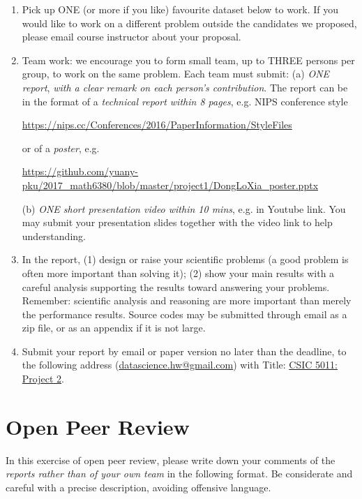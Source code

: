 \documentclass[11pt]{article}
\begin{document}
\begin{enumerate}
\item Pick up ONE (or more if you like) favourite dataset below to work. If you would like to work on a different problem outside the candidates we proposed, please email course instructor about your proposal.  
\item Team work: we encourage you to form small team, up to THREE persons per group, to work on the same problem. Each team must submit:
\subitem(a) \emph{ONE report}, \emph{with a clear remark on each person's contribution}. The report can be in the format of a \emph{technical report within 8 pages}, e.g. NIPS conference style 
\begin{center}
\url{https://nips.cc/Conferences/2016/PaperInformation/StyleFiles} 
\end{center}
or of a \emph{poster}, e.g. 
\begin{center}%
\url{https://github.com/yuany-pku/2017_math6380/blob/master/project1/DongLoXia_poster.pptx}
\end{center}
\subitem(b) \emph{ONE short presentation video within 10 mins}, e.g. in Youtube link. You may submit your presentation slides together with the video link to help understanding. 
\item In the report, (1) design or raise your scientific problems (a good problem is often more important than solving it); (2) show your main results with a careful analysis supporting the results toward answering your problems. Remember: scientific analysis and reasoning are more important than merely the performance results. Source codes may be submitted through email as a zip file, or as an appendix if it is not large.    
\item Submit your report by email or paper version no later than the deadline, to the following address (\href{mailto:datascience.hw@gmail.com}{datascience.hw@gmail.com}) with Title: \underline{CSIC 5011: Project 2}. %
\end{enumerate}

\newpage

\section*{Open Peer Review}

In this exercise of open peer review, please write down your comments of the \emph{reports rather than of your own team} in the following format. Be considerate and careful with a precise description, avoiding offensive language. 
\end{document}
